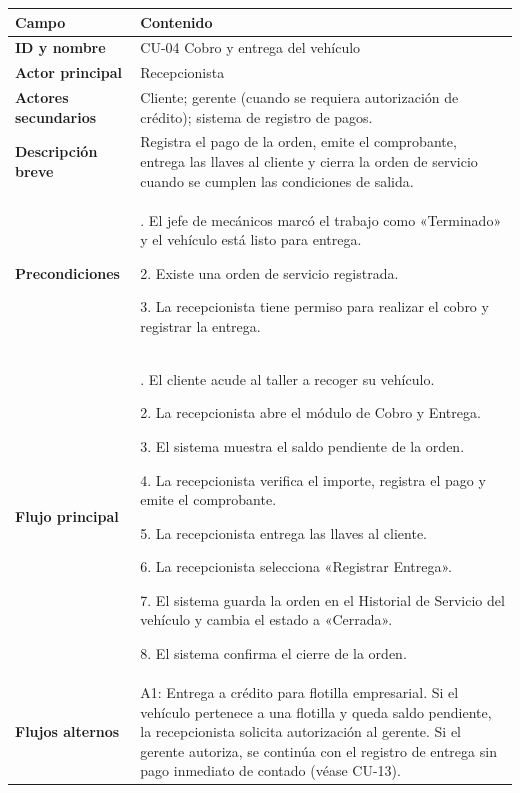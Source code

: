 {\def\LTcaptype{none} %
\begin{longtable}[]{@{}
  >{\raggedright\arraybackslash}p{}
  >{\raggedright\arraybackslash}p{}@{}}
\toprule\noalign{}
\begin{minipage}[b]{\linewidth}\raggedright
\textbf{Campo}
\end{minipage} & \begin{minipage}[b]{\linewidth}\raggedright
\textbf{Contenido}
\end{minipage} \\
\midrule\noalign{}
\endhead
\bottomrule\noalign{}
\endlastfoot
\textbf{ID y nombre} & CU-04 Cobro y entrega del vehículo \\
\textbf{Actor principal} & Recepcionista \\
\textbf{Actores secundarios} & Cliente; gerente (cuando se requiera
autorización de crédito); sistema de registro de pagos. \\
\textbf{Descripción breve} & Registra el pago de la orden, emite el
comprobante, entrega las llaves al cliente y cierra la orden de servicio
cuando se cumplen las condiciones de salida. \\
\textbf{Precondiciones} & 1. El jefe de mecánicos marcó el trabajo como
«Terminado» y el vehículo está listo para entrega.

2. Existe una orden de servicio registrada.

3. La recepcionista tiene permiso para realizar el cobro y registrar la
entrega. \\
\textbf{Flujo principal} & 1. El cliente acude al taller a recoger su
vehículo.

2. La recepcionista abre el módulo de Cobro y Entrega.

3. El sistema muestra el saldo pendiente de la orden.

4. La recepcionista verifica el importe, registra el pago y emite el
comprobante.

5. La recepcionista entrega las llaves al cliente.

6. La recepcionista selecciona «Registrar Entrega».

7. El sistema guarda la orden en el Historial de Servicio del vehículo y
cambia el estado a «Cerrada».

8. El sistema confirma el cierre de la orden. \\
\textbf{Flujos alternos} & A1: Entrega a crédito para flotilla
empresarial. Si el vehículo pertenece a una flotilla y queda saldo
pendiente, la recepcionista solicita autorización al gerente. Si el
gerente autoriza, se continúa con el registro de entrega sin pago
inmediato de contado (véase CU-13).


\end{longtable}}
